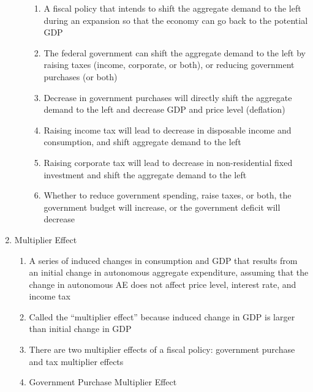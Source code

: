 \documentclass[12pt]{article}
\begin{document}
\begin{enumerate}
\begin{enumerate}
\begin{enumerate}
              \item A fiscal policy that intends to shift the aggregate demand to the left during an expansion so that the economy can go back to the potential GDP

              \item The federal government can shift the aggregate demand to the left by raising taxes (income, corporate, or both), or reducing government purchases (or both)

              \item Decrease in government purchases will directly shift the aggregate demand to the left and decrease GDP and price level (deflation)

              \item Raising income tax will lead to decrease in disposable income and consumption, and shift aggregate demand to the left

              \item Raising corporate tax will lead to decrease in non-residential fixed investment and shift the aggregate demand to the left

              \item Whether to reduce government spending, raise taxes, or both, the government budget will increase, or the government deficit will decrease

            \end{enumerate}

        \end{enumerate}

      \item Multiplier Effect

        \begin{enumerate}

          \item A series of induced changes in consumption and GDP that results from an initial change in autonomous aggregate expenditure, assuming that the change in autonomous AE does not affect price level, interest rate, and income tax

          \item Called the “multiplier effect” because induced change in GDP is larger than initial change in GDP

          \item There are two multiplier effects of a fiscal policy: government purchase and tax multiplier effects

          \item Government Purchase Multiplier Effect


\end{enumerate}
\end{enumerate}
\end{document}

